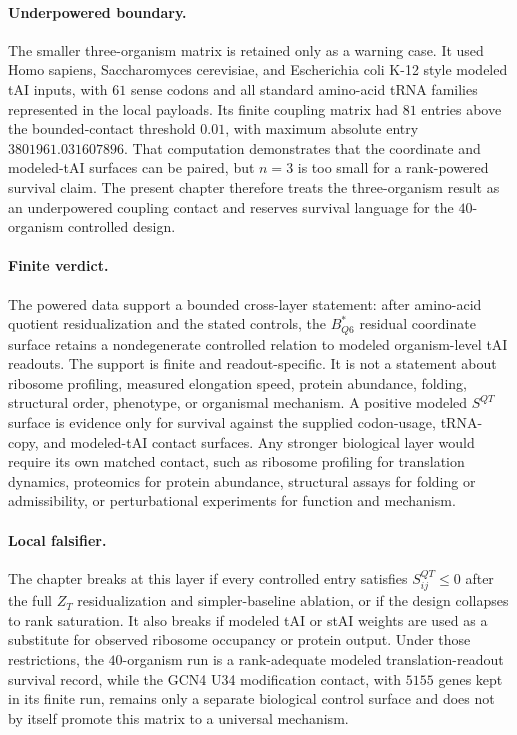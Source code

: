 \paragraph{Underpowered boundary.} The smaller three-organism matrix is retained only as a warning case. It used Homo sapiens, Saccharomyces cerevisiae, and Escherichia coli K-12 style modeled tAI inputs, with $61$ sense codons and all standard amino-acid tRNA families represented in the local payloads. Its finite coupling matrix had $81$ entries above the bounded-contact threshold $0.01$, with maximum absolute entry $3801961.031607896$. That computation demonstrates that the coordinate and modeled-tAI surfaces can be paired, but $n=3$ is too small for a rank-powered survival claim. The present chapter therefore treats the three-organism result as an underpowered coupling contact and reserves survival language for the $40$-organism controlled design.

\paragraph{Finite verdict.} The powered data support a bounded cross-layer statement: after amino-acid quotient residualization and the stated controls, the $B^{\ast}_{Q6}$ residual coordinate surface retains a nondegenerate controlled relation to modeled organism-level tAI readouts. The support is finite and readout-specific. It is not a statement about ribosome profiling, measured elongation speed, protein abundance, folding, structural order, phenotype, or organismal mechanism. A positive modeled $S^{QT}$ surface is evidence only for survival against the supplied codon-usage, tRNA-copy, and modeled-tAI contact surfaces. Any stronger biological layer would require its own matched contact, such as ribosome profiling for translation dynamics, proteomics for protein abundance, structural assays for folding or admissibility, or perturbational experiments for function and mechanism.

\paragraph{Local falsifier.} The chapter breaks at this layer if every controlled entry satisfies $S^{QT}_{ij}\leq 0$ after the full $Z_T$ residualization and simpler-baseline ablation, or if the design collapses to rank saturation. It also breaks if modeled tAI or stAI weights are used as a substitute for observed ribosome occupancy or protein output. Under those restrictions, the $40$-organism run is a rank-adequate modeled translation-readout survival record, while the GCN4 U34 modification contact, with $5155$ genes kept in its finite run, remains only a separate biological control surface and does not by itself promote this matrix to a universal mechanism.

